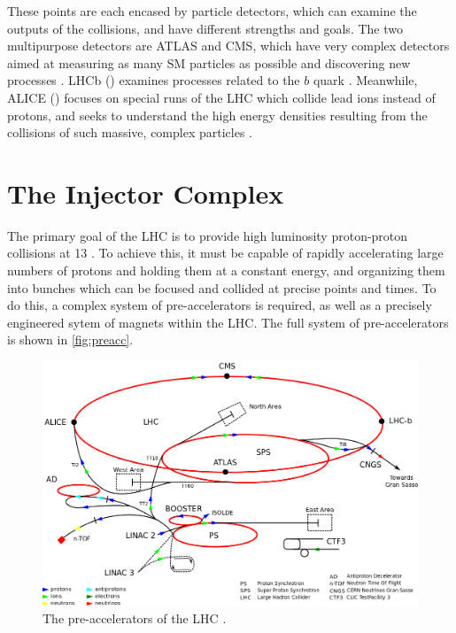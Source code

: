 These points are each encased by particle detectors, which can examine the outputs of the collisions, and have different strengths and goals. The two multipurpose detectors are \ac{ATLAS} and \ac{CMS}, which have very complex detectors aimed at measuring as many \ac{SM} particles as possible and discovering new processes \cite{PERF-2007-01, 1748-0221-3-08-S08004}. \acs{LHCb} () examines processes related to the $b$ quark \cite{1748-0221-3-08-S08005}. Meanwhile, \acs{ALICE} () focuses on special runs of the \ac{LHC} which collide lead ions instead of protons, and seeks to understand the high energy densities resulting from the collisions of such massive, complex particles \cite{1748-0221-3-08-S08002}. 


\section{The Injector Complex}
\label{sec:lhc_inj}

The primary goal of the \ac{LHC} is to provide high luminosity proton-proton collisions at 13 \tev. %
To achieve this, it must be capable of rapidly accelerating large numbers of protons and holding them at a constant energy, and organizing them into bunches which can be focused and collided at precise points and times. To do this, a complex system of pre-accelerators is required, as well as a precisely engineered sytem of magnets within the \ac{LHC}. The full system of pre-accelerators is shown in \autoref{fig:preacc}.

\begin{centering}
\begin{figure}[!hbt]
\myfloatalign
\includegraphics[width=.90\linewidth]{figures/lhc/Cern-accelerator-complex.png}
\caption{The pre-accelerators of the \ac{LHC} \cite{preacc}.}
\label{fig:preacc}
\end{figure}
\end{centering}

